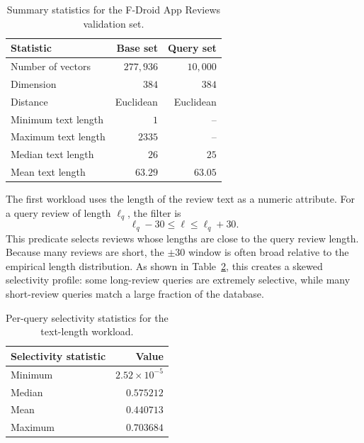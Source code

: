 \begin{table}[H]
    \centering
    \renewcommand{\arraystretch}{1.15}
    \begin{tabular}{lrr}
        \toprule
        Statistic & Base set & Query set \\
        \midrule
        Number of vectors & \(277{,}936\) & \(10{,}000\) \\
        Dimension & \(384\) & \(384\) \\
        Distance & Euclidean & Euclidean \\
        \midrule
        Minimum text length & \(1\) & -- \\
        Maximum text length & \(2335\) & -- \\
        Median text length & \(26\) & \(25\) \\
        Mean text length & \(63.29\) & \(63.05\) \\
        \bottomrule
    \end{tabular}
    \caption{Summary statistics for the F-Droid App Reviews validation set.}
    \label{tab:app-reviews-summary}
\end{table}

The first workload uses the length of the review text as a numeric attribute.
For a query review of length \(\ell_q\), the filter is
\[
    \ell_q - 30 \le \ell \le \ell_q + 30 .
\]
This predicate selects reviews whose lengths are close to the query review
length. Because many reviews are short, the \(\pm 30\) window is often broad
relative to the empirical length distribution. As shown in
Table~\ref{tab:app-reviews-length-selectivity}, this creates a skewed
selectivity profile: some long-review queries are extremely selective, while
many short-review queries match a large fraction of the database.

\begin{table}[H]
    \centering
    \renewcommand{\arraystretch}{1.15}
    \begin{tabular}{lr}
        \toprule
        Selectivity statistic & Value \\
        \midrule
        Minimum & \(2.52 \times 10^{-5}\) \\
        Median & \(0.575212\) \\
        Mean & \(0.440713\) \\
        Maximum & \(0.703684\) \\
        \bottomrule
    \end{tabular}
    \caption{Per-query selectivity statistics for the text-length workload.}
    \label{tab:app-reviews-length-selectivity}
\end{table}

